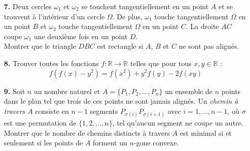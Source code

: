 \documentclass[12pt,a4paper]{article}
\theoremstyle{plain}
\theoremstyle{definition}
\begin{document}
\begin{enumerate}
\item[\textbf{7.}] Deux cercles $\omega_1$ et $\omega_2$ se touchent tangentiellement en un point $A$ et se trouvent à l'intérieur d'un cercle $\Omega$. De plus, $\omega_1$ touche tangentiellement $\Omega$ en un point $B$ et $\omega_2$ touche tangentiellement $\Omega$ en un point $C$. La droite $AC$ coupe $\omega_1$ une deuxième fois en un point $D$.\\
Montrer que le triangle $DBC$ est rectangle si $A$, $B$ et $C$ ne sont pas alignés.

\bigskip
\bigskip

\item[\textbf{8.}] Trouver toutes les fonctions $f:\mathbb{R} \rightarrow \mathbb{R}$ telles que pour tous $x,y \in \mathbb{R}$ :
\[f(f(x)-y^2)= f(x^2) +y^2f(y) -2f(xy)\]

\bigskip
\bigskip

\item[\textbf{9.}] Soit $n$ un nombre naturel et $A=\{P_1,P_2,\dots,P_n\}$ un ensemble de $n$ points dans le plan tel que trois de ces points ne sont jamais alignés. Un \textit{chemin à travers $A$} consiste en $n-1$ segments $P_{\sigma(i)}P_{\sigma(i+1)}$ avec $i=1,\dots,n-1$, où $\sigma$ est une permutation de $\{1,2,\dots,n\}$, tel qu'aucun segment ne coupe un autre.\\
Montrer que le nombre de chemins distincts à travers $A$ est minimal si et seulement si les points de $A$ forment un $n$-gone convexe.







\end{enumerate}
\end{document}
